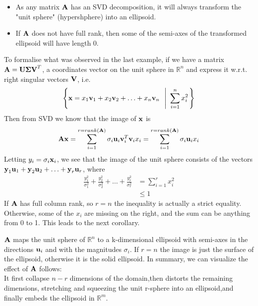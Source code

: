 \documentclass[a4paper]{article}
\numberwithin{equation}{section} %
\newcounter{example}
\newcommand{\setR}{\mathbb{R}} %
\newcommand{\setRn}{\mathbb{R}^n} %
\newcommand{\hquad}{\hskip0.5em\relax}%
\newcommand{\B}[1]{\textbf{\textup{#1}}} %
\begin{document}
\begin{corollary}\quad \newline
\begin{itemize}
\item As any matrix $\B{A}$ has an SVD decomposition, it will always transform the "unit sphere" (hypershphere) into an ellipsoid.
\item If $\B{A}$ does not have full rank, then some of the semi-axes of the transformed ellipsoid will have length 0.
\end{itemize}
\end{corollary}
To formalise what was observed in the last example, if we have a matrix $\B{A}=\B{U}\boldsymbol{\Sigma}\B{V}^T$, a coordinates vector on the unit sphere in $\setR^n$  and express it w.r.t. right singular vectors $\B{V}$, i.e. 
\[
\left \{ \B{x}=x_1\B{v}_1 + x_2\B{v}_2 + \ldots + x_n\B{v}_n  \hquad \left| \hquad \sum\limits_{i=1}^{n}{x_{i}^{2}} \right.  \right \}
\]
Then from SVD we know that the image of $\B{x}$ is
\[
\B{Ax}=\sum\limits_{i=1}^{r=rank\left( \mathbf{A} \right)}{{{\sigma }_{i}}{{\mathbf{u}}_{i}}\mathbf{v}_{i}^{T}{{\mathbf{v}}_{i}}{{x}_{i}}}=\sum\limits_{i=1}^{r=rank\left( \mathbf{A} \right)}{{{\sigma }_{i}}{{\mathbf{u}}_{i}}{{x}_{i}}}
\]
Letting $y_i=\sigma_i\B{x}_i$, we see that the image of the unit sphere consists of the vectors $\B{y}_1\B{u}_1 + \B{y}_2\B{u}_2 + \ldots + \B{y}_r\B{u}_r$, where~\cite{lec_notes_kalman}
\[
\begin{split}
\frac{y_{1}^{2}}{\sigma _{1}^{2}}+\frac{y_{2}^{2}}{\sigma _{2}^{2}}+\ldots +\frac{y_{r}^{2}}{\sigma _{r}^{2}} &= \sum\limits_{i=1}^{r}{x_{i}^{2}} \\
& \leq 1
\end{split}
\]
If $\B{A}$ has full column rank, so $r=n$ the inequality is actually a strict equality.  Otherwise, some of the $x_i$ are missing on the right, and the sum can be anything from 0 to 1. This leads to the next corollary.

\begin{corollary}
$\B{A}$ maps the  unit  sphere  of $\setRn$ to  a k-dimensional  ellipsoid  with  semi-axes  in  the  directions $\B{u}_i$ and  with  the magnitudes $\sigma_i$. If $r=n$ the image is just the surface of the ellipsoid, otherwise it is the solid ellipsoid. In summary, we can visualize the effect of $\B{A}$ follows:  \\
It first collapse $n-r$ dimensions of the domain,then  distorts  the  remaining  dimensions,  stretching  and  squeezing  the  unit r-sphere  into  an  ellipsoid,and finally embeds the ellipsoid in $\setR ^ m$.
\end{corollary}
\end{document}
